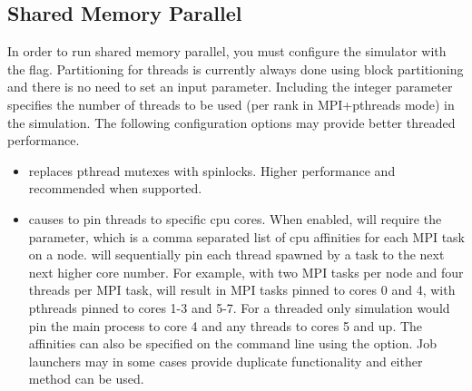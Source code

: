 \subsection{Shared Memory Parallel}
\label{subsec:parallelopt}
In order to run shared memory parallel, you must configure the simulator with the  flag.
Partitioning for threads is currently always done using block partitioning and there is no need to set an input parameter.
Including the integer parameter  specifies the number of threads to be used (per rank in MPI+pthreads mode) in the simulation.
The following configuration options may provide better threaded performance.
\begin{itemize}
\item{} replaces pthread mutexes with spinlocks.  Higher performance and recommended when supported.
\item{} causes \sstmacro to pin threads to specific cpu cores.  When enabled, \sstmacro will require the
 parameter, which is a comma separated list of cpu affinities for each MPI task on a node.  \sstmacro will sequentially
pin each thread spawned by a task to the next next higher core number.  For example, with two MPI tasks per node and four threads per MPI task,
 will result in MPI tasks pinned to cores 0 and 4, with pthreads pinned to cores 1-3 and 5-7.
For a threaded only simulation  would pin the main process to core 4 and any threads to cores 5 and up.
The affinities can also be specified on the command line using the  option.
Job launchers may in some cases provide duplicate functionality and either method can be used.
\end{itemize}

